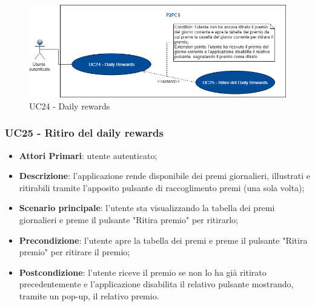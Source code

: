 \begin{figure}[h]
	\includegraphics[width=13.2cm]{res/images/UC24Daily.png}
	\centering
	\caption{UC24 - Daily rewards}
\end{figure}
\subsubsection{UC25 - Ritiro del daily rewards}
\begin{itemize}
	\item \textbf{Attori Primari}: utente autenticato;
	\item \textbf{Descrizione}: l'applicazione rende disponibile dei premi giornalieri, illustrati e ritirabili tramite l'apposito pulsante di raccoglimento premi (una sola volta);
	\item \textbf{Scenario principale}: l'utente sta visualizzando la tabella dei premi giornalieri e preme il pulsante "Ritira premio" per ritirarlo;
	\item \textbf{Precondizione}: l'utente apre la tabella dei premi e preme il pulsante "Ritira premio" per ritirare il premio;
	\item \textbf{Postcondizione}: l'utente riceve il premio se non lo ha già ritirato precedentemente e l'applicazione disabilita il relativo pulsante mostrando, tramite un pop-up, il relativo premio.  
\end{itemize} 